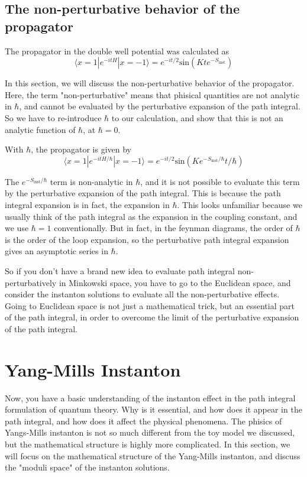 \documentclass{article}
\begin{document}
\subsection{The non-perturbative behavior of the propagator}
The propagator in the double well potential was calculated as
\begin{equation}
    \langle x = 1 | e^{-itH} | x = -1 \rangle = e^{-it/2}  \text{sin}(Kt e^{-S_{\text{inst}}})
\end{equation}

In this section, we will discuss the non-perturbative behavior of the propagator.
Here, the term "non-perturbative" means that phisical quantities are not analytic in $\hbar$, and cannot be evaluated by the perturbative expansion of the path integral.
So we have to re-introduce $\hbar$ to our calculation, and show that this is not an analytic function of $\hbar$, at $\hbar = 0$.

With $\hbar$, the propagator is given by
\begin{equation}
    \langle x = 1 | e^{-itH/\hbar} | x = -1 \rangle = e^{-it/2}  \text{sin}(Ke^{-S_{\text{inst}}/\hbar} t/\hbar)
\end{equation}

The $e^{-S_{\text{inst}}/\hbar}$ term is non-analytic in $\hbar$, and it is not possible to evaluate this term by the perturbative expansion of the path integral.
This is because the path integral expansion is in fact, the expansion in $\hbar$. This looks unfamiliar because we usually think of the path integral as the expansion in the coupling constant, and we use $\hbar=1$ conventionally.
But in fact, in the feynman diagrams, the order of $\hbar$ is the order of the loop expansion, so the perturbative path integral expansion gives an asymptotic series in $\hbar$.

So if you don't have a brand new idea to evaluate path integral non-perturbatively in Minkowski space, you have to go to the Euclidean space, and consider the instanton solutions to evaluate all the non-perturbative effects.
Going to Euclidean space is not just a mathematical trick, but an essential part of the path integral, in order to overcome the limit of the perturbative expansion of the path integral.
\section{Yang-Mills Instanton}
Now, you have a basic understanding of the instanton effect in the path integral formulation of quantum theory.
Why is it essential, and how does it appear in the path integral, and how does it affect the physical phenomena.
The phisics of Yangs-Mills instanton is not so much different from the toy model we discussed, but the mathematical structure is highly more complicated.
In this section, we will focus on the mathematical structure of the Yang-Mills instanton, and discuss the "moduli space" of the instanton solutions.
\end{document}
